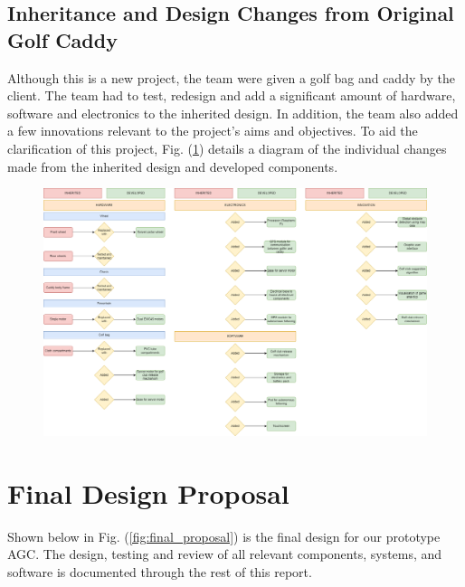\documentclass[11pt,landscape]{article}
\begin{document}
\begin{multicols}{2}
\subsection{Inheritance and Design Changes from Original Golf Caddy}
Although this is a new project, the team were given a golf bag and caddy by the
client. The team had to test, redesign and add a significant amount of hardware,
software and electronics to the inherited design. In addition, the team also
added a few innovations relevant to the project’s aims and objectives. To aid
the clarification of this project, Fig. (\ref{fig:inheritance}) details a diagram of the
individual changes made from the inherited design and developed components. 
\end{multicols}
\newpage

\begin{figure}[H]
    \begin{center}
        \includegraphics[width=\textwidth]{inheritance.png}
    \end{center}
    \label{fig:inheritance}
\end{figure}


\newpage

\section{Final Design Proposal}
Shown below in Fig. (\ref{fig:final_proposal}) is the final design for our
prototype AGC. The design, testing and review of all relevant components, systems, and software is
documented through the rest of this report.
\end{document}
